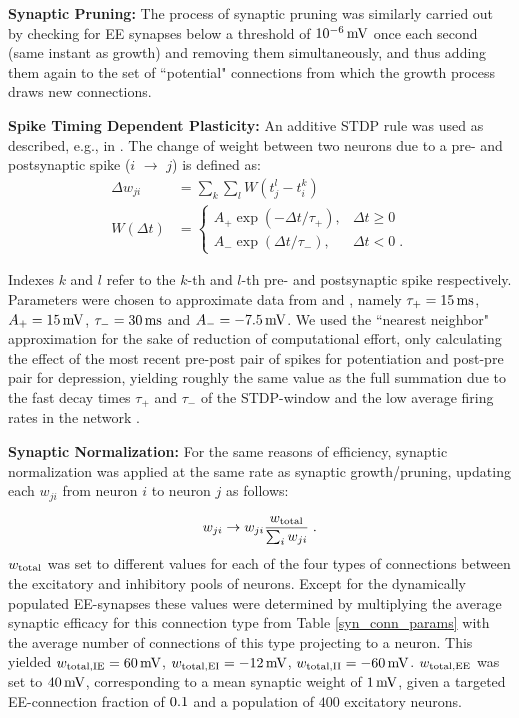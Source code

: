 \documentclass[10pt,letterpaper]{article}
\begin{document}
\textbf{Synaptic Pruning:} The process of synaptic pruning was similarly carried out by checking for EE synapses below a threshold of $\rm 10^{-6}\, mV$ once each second (same instant as growth) and removing them simultaneously, and thus adding them again to the set of ``potential" connections from which the growth process draws new connections.

\textbf{Spike Timing Dependent Plasticity:} An additive STDP rule was used as described, e.g., in \cite{Zhang_STDP}. The change of weight between two neurons due to a pre- and postsynaptic spike ($i$ $\rightarrow$ $j$) is defined as:
\begin{align}
\Delta w_{ji} &= \sum_k \sum_l W(t_j^l - t_i^k) \label{STDP_rule} \\
W(\Delta t) &= \begin{cases}
A_{+} \exp(-\Delta t / \tau_{+}), & \Delta t \geq 0  \\
A_{-} \exp(\Delta t / \tau_{-}), & \Delta t < 0 \; . \label{STDP_pos_neg}
\end{cases}
\end{align}



Indexes $k$ and $l$ refer to the $k$-th and $l$-th pre- and postsynaptic spike respectively. Parameters were chosen to approximate data from \cite{Bi_Poo_STDP} and \cite{Froemke_STDP}, namely $\tau_{+} = \rm 15\, ms$, $A_{+} =\rm 15\, mV$, $\tau_{-} =\rm 30\, ms$ and $A_{-} =\rm -7.5\, mV$. We used the ``nearest neighbor" approximation for the sake of reduction of computational effort, only calculating the effect of the most recent pre-post pair of spikes for potentiation and post-pre pair for depression, yielding roughly the same value as the full summation due to the fast decay times $\tau_{+}$ and $\tau_{-}$ of the STDP-window and the low average firing rates in the network \cite{vanRossum_2000}.

\textbf{Synaptic Normalization:} For the same reasons of efficiency, synaptic normalization was applied at the same rate as synaptic growth/pruning, updating each $w_{ji}$ from neuron $i$ to neuron $j$ as follows:

\begin{equation}
w_{ji} \rightarrow w_{ji} \frac{w_{\rm total}}{\sum_i w_{ji}} \; .
\label{Synnnorm}
\end{equation}
$w_{\rm total}$ was set to different values for each of the four types of connections between the excitatory and inhibitory pools of neurons. Except for the dynamically populated EE-synapses these values were determined by multiplying the average synaptic efficacy for this connection type from Table \ref{syn_conn_params} with the average number of connections of this type projecting to a neuron. This yielded $w_{\rm total,IE} = \rm 60\, mV$, $w_{\rm total,EI} =\rm -12\, mV$, $w_{\rm total,II} = \rm -60\, mV$. $w_{\rm total,EE}$ was set to $\rm 40\, mV$,  corresponding to a mean synaptic weight of $\rm 1\, mV$, given a targeted EE-connection fraction of $\rm 0.1$ and a population of $400$ excitatory neurons.
\end{document}
